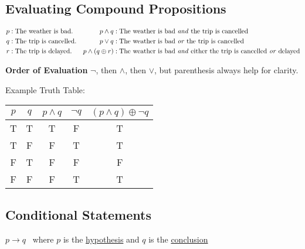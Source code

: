 \subsection{Evaluating Compound Propositions}

\begin{align*}
  p & : \text{The weather is bad.}    & p \land q            & : \text{The weather is bad \textit{and} the trip is cancelled}                            \\
  q & : \text{The trip is cancelled.} & p \lor q             & : \text{The weather is bad \textit{or} the trip is cancelled}                             \\
  r & : \text{The trip is delayed.}   & p \land (q \oplus r) & : \text{The weather is bad \textit{and} either the trip is cancelled \textit{or} delayed} \\
\end{align*}

\textbf{Order of Evaluation} \(\lnot\), then \(\land\), then \(\lor\), but parenthesis always help for clarity.

\begin{center}
  Example Truth Table:
  \qquad
  \begin{tabular}{c|c|c|c|c}
    \(p\) & \(q\) & \(p \land q\) & \(\lnot q\) & \((p \land q) \oplus \lnot q\) \\
    \hline
    T     & T     & T             & F           & T                              \\
    T     & F     & F             & T           & T                              \\
    F     & T     & F             & F           & F                              \\
    F     & F     & F             & T           & T                              \\
  \end{tabular}
\end{center}

\subsection{Conditional Statements}

\begin{center}
  \(p \rightarrow q\) \ where \(p\) is the \underline{hypothesis} and \(q\) is the \underline{conclusion}
\end{center}

